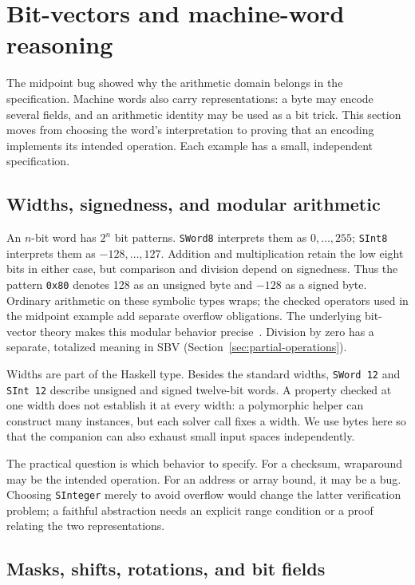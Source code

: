 \documentclass[review]{jfp-epi}
\newcommand{\code}[1]{\texttt{#1}}
\begin{document}
\section{Bit-vectors and machine-word reasoning}
\label{sec:bit-vectors}

The midpoint bug showed why the arithmetic domain belongs in the specification.
Machine words also carry representations: a byte may encode several fields, and
an arithmetic identity may be used as a bit trick. This section moves from
choosing the word's interpretation to proving that an encoding implements its
intended operation. Each example has a small, independent specification.


\subsection{Widths, signedness, and modular arithmetic}
\label{sec:bit-vector-semantics}

An $n$-bit word has $2^n$ bit patterns. \code{SWord8} interprets them as
$0,\ldots,255$; \code{SInt8} interprets them as $-128,\ldots,127$.
Addition and multiplication retain the low eight bits in either case, but
comparison and division depend on signedness. Thus the pattern \code{0x80}
denotes 128 as an unsigned byte and $-128$ as a signed byte. Ordinary arithmetic
on these symbolic types wraps; the checked operators used in the midpoint
example add separate overflow obligations. The underlying bit-vector theory
makes this modular behavior precise~\citep{smtbitvectors}. Division by zero
has a separate, totalized meaning in SBV (Section~\ref{sec:partial-operations}).

Widths are part of the Haskell type. Besides the standard widths, \code{SWord 12}
and \code{SInt 12} describe unsigned and signed twelve-bit words. A property
checked at one width does not establish it at every width: a polymorphic helper
can construct many instances, but each solver call fixes a width. We use bytes
here so that the companion can also exhaust small input spaces independently.

The practical question is which behavior to specify. For a checksum, wraparound
may be the intended operation. For an address or array bound, it may be a bug.
Choosing \code{SInteger} merely to avoid overflow would change the latter
verification problem; a faithful abstraction needs an explicit range condition
or a proof relating the two representations.


\subsection{Masks, shifts, rotations, and bit fields}
\label{sec:bit-operations}
\end{document}
